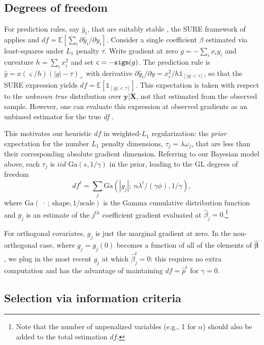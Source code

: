 \documentclass[twoside]{article}
\newcommand{\bs}[1]{\boldsymbol{#1}}
\newcommand{\mr}[1]{\mathrm{#1}}
\newcommand{\bm}[1]{\mathbf{#1}}
\newcommand{\ds}[1]{\mathds{#1}}
\begin{document}
\subsection{Degrees of freedom}


For prediction rules, say $\hat y_i$, that are suitably stable \citep[i.e.,
Lipschitz; see][]{zou_degrees_2007}, the SURE framework of
\cite{stein_estimation_1981} applies and  $df =
\ds{E}\left[\sum_i \partial \hat y_i/\partial y_i\right]$.
Consider  a single coefficient $\beta$ estimated via least-squares under $L_1$
penalty $\tau$.   Write gradient at zero $g = -\sum_i x_iy_i$ and curvature $h
= \sum_i x_i^2$ and set $\varsigma = -{\tt sign}(g)$. The prediction rule is
$\hat y = x(\varsigma/h)(|g|-\tau)_+$ with  derivative $\partial\hat y_i/\partial y = x_i^2/h \ds{1}_{[|g|<\tau]}$, so that the SURE expression
yields $df = \ds{E}\left[ \ds{1}_{[|g|<\tau]} \right]$.   This expectation is
taken with respect to the {\it unknown true} distribution over $\bm{y} |
\bm{X}$, not that estimated from the observed sample.  However, 
 one can evaluate this expression at observed
gradients as an unbiased estimator for the true \textit{df} \citep[e.g.,][]{zou_degrees_2007}.

This motivates our heuristic $df$ in weighted-$L_1$ regularization:  the {\it prior} expectation for the number  $L_1$ penalty dimensions, $\tau_j = \lambda \omega_j$, that are less than their corresponding absolute gradient dimension.  Referring to our Bayesian model above, each $\tau_j$ is $iid$ $\mr{Ga}(s,1/\gamma)$ in the prior,
leading to the GL degrees of freedom
\begin{equation}
\label{edf} df^t = \sum_j \mr{Ga}(|g_{j}|;~n\lambda^t/(\gamma\phi),
1/\gamma), \end{equation} where $\mr{Ga}(~\cdot~;~\mr{shape}, 1/\mr{scale})$
is the Gamma cumulative distribution function and $g_j$ is an estimate of  the
$j^{th}$ coefficient gradient evaluated at $\hat\beta_j=0$.\footnote{Note that the number of unpenalized variables (e.g., 1 for $\alpha$) should also be added to the total  estimation $df$. }

For  orthogonal covariates,  $g_j$ is just the marginal gradient at zero.
In the non-orthogonal case, where $g_{j} = g_j(0)$ becomes a
function of all of the elements of $\bs{\hat\beta}$, we plug in the most recent
$g_j$ at which $\hat\beta^t_j=0$:  this
requires no extra computation and has the advantage of maintaining $df =
\hat p^t$ for $\gamma = 0$.

\subsection{Selection via information criteria}
\end{document}

